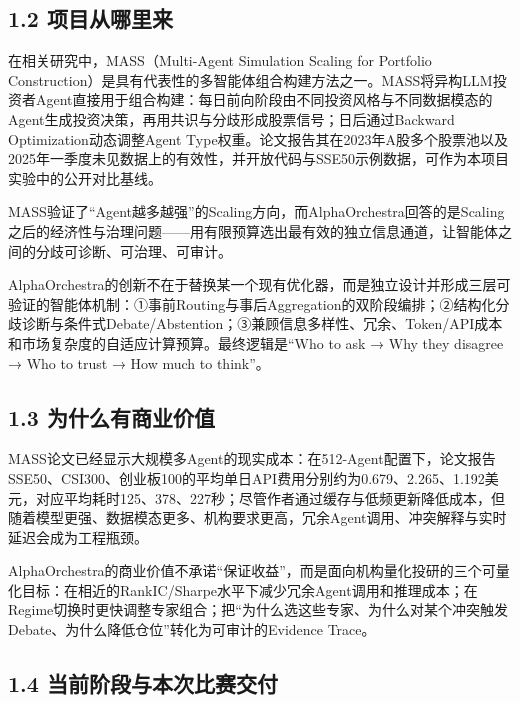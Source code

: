 \documentclass[12pt,a4paper]{ctexart}
\begin{document}
\subsection{\texorpdfstring{\textbf{1.2
项目从哪里来}}{1.2 项目从哪里来}}\label{ux9879ux76eeux4eceux54eaux91ccux6765}

在相关研究中，MASS（Multi-Agent Simulation Scaling for Portfolio
Construction）是具有代表性的多智能体组合构建方法之一。MASS将异构LLM投资者Agent直接用于组合构建：每日前向阶段由不同投资风格与不同数据模态的Agent生成投资决策，再用共识与分歧形成股票信号；日后通过Backward
Optimization动态调整Agent
Type权重。论文报告其在2023年A股多个股票池以及2025年一季度未见数据上的有效性，并开放代码与SSE50示例数据，可作为本项目实验中的公开对比基线。

MASS验证了``Agent越多越强''的Scaling方向，而AlphaOrchestra回答的是Scaling之后的经济性与治理问题------用有限预算选出最有效的独立信息通道，让智能体之间的分歧可诊断、可治理、可审计。

AlphaOrchestra的创新不在于替换某一个现有优化器，而是独立设计并形成三层可验证的智能体机制：①事前Routing与事后Aggregation的双阶段编排；②结构化分歧诊断与条件式Debate/Abstention；③兼顾信息多样性、冗余、Token/API成本和市场复杂度的自适应计算预算。最终逻辑是``Who
to ask → Why they disagree → Who to trust → How much to think''。

\subsection{\texorpdfstring{\textbf{1.3
为什么有商业价值}}{1.3 为什么有商业价值}}\label{ux4e3aux4ec0ux4e48ux6709ux5546ux4e1aux4ef7ux503c}

MASS论文已经显示大规模多Agent的现实成本：在512-Agent配置下，论文报告SSE50、CSI300、创业板100的平均单日API费用分别约为0.679、2.265、1.192美元，对应平均耗时125、378、227秒；尽管作者通过缓存与低频更新降低成本，但随着模型更强、数据模态更多、机构要求更高，冗余Agent调用、冲突解释与实时延迟会成为工程瓶颈。

AlphaOrchestra的商业价值不承诺``保证收益''，而是面向机构量化投研的三个可量化目标：在相近的RankIC/Sharpe水平下减少冗余Agent调用和推理成本；在Regime切换时更快调整专家组合；把``为什么选这些专家、为什么对某个冲突触发Debate、为什么降低仓位''转化为可审计的Evidence
Trace。

\subsection{\texorpdfstring{\textbf{1.4
当前阶段与本次比赛交付}}{1.4 当前阶段与本次比赛交付}}\label{ux5f53ux524dux9636ux6bb5ux4e0eux672cux6b21ux6bd4ux8d5bux4ea4ux4ed8}
\end{document}
